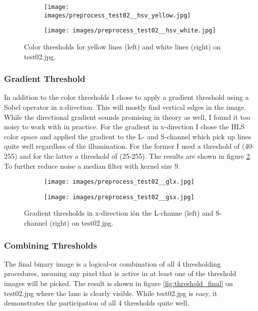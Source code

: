 \documentclass[a4paper, 11pt, DIV=14]{scrartcl}
\begin{document}
\begin{figure}[h]
    \centering
    \begin{subfigure}{0.45\textwidth}
        \texttt{[image: images/preprocess\_test02\_\_hsv\_yellow.jpg]}
    \end{subfigure}\quad
    \begin{subfigure}{0.45\textwidth}
        \texttt{[image: images/preprocess\_test02\_\_hsv\_white.jpg]}
    \end{subfigure} 
    \caption{Color thresholds for yellow lines (left) and white lines (right) on test02.jpg.}
    \label{fig:color_threshold}
\end{figure}

\subsubsection*{Gradient Threshold}
In addition to the color thresholds I chose to apply a gradient threshold using a Sobel operator in x-direction. This will mostly find vertical edges in the image. While the directional gradient sounds promising in theory as well, I found it too noisy to work with in practice. For the gradient in x-direction I chose the HLS color space and applied the gradient to the L- and S-channel which pick up lines quite well regardless of the illumination. For the former I used a threshold of (40-255) and for the latter a threshold of (25-255). The results are shown in figure \ref{fig:gradient_threshold}. To further reduce noise a median filter with kernel size 9.

\begin{figure}[h]
    \centering
    \begin{subfigure}{0.45\textwidth}
        \texttt{[image: images/preprocess\_test02\_\_glx.jpg]}
    \end{subfigure}\quad
    \begin{subfigure}{0.45\textwidth}
        \texttt{[image: images/preprocess\_test02\_\_gsx.jpg]}
    \end{subfigure} 
    \caption{Gradient thresholds in x-direction ión the L-channe (left) and S-channel (right) on test02.jpg.}
    \label{fig:gradient_threshold}
\end{figure}

\subsubsection*{Combining Thresholds}
The final binary image is a logical-or combination of all 4 thresholding procedures, meaning any pixel that is active in at least one of the threshold images will be picked. The result is shown in figure \ref{fig:threshold_final} on test02.jpg where the lane is clearly visible. While test02.jpg is easy, it demonstrates the participation of all 4 thresholds quite well.
\end{document}
